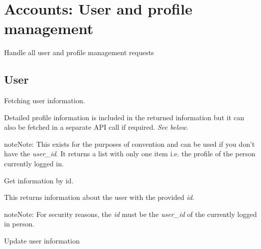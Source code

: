 \documentclass[letterpaper,10pt,english]{sphinxmanual}
\begin{document}
\begin{fulllineitems}
\label{auth:post--api-v1-auth-logout-}
\end{fulllineitems}



\chapter{Accounts: User and profile management}
\label{accounts:ref-accounts}\label{accounts:accounts-user-and-profile-management}\label{accounts::doc}
Handle all user and profile management requests


\section{User}
\label{accounts:user}
Fetching user information.


\begin{fulllineitems}
\label{accounts:get--api-v1-user-}
\end{fulllineitems}


Detailed profile information is included in the returned information but it can
also be fetched in a separate API call if required. \emph{See below}.

\begin{notice}{note}{Note:}
This exists for the purposes of convention and can be used if you don't have the \emph{user\_id}.
It returns a list with only one item i.e. the profile of the person currently logged in.
\end{notice}

Get information by id.


\begin{fulllineitems}
\label{accounts:get--api-v1-profile-_id_-}
\end{fulllineitems}


This returns information about the user with the provided \emph{id}.

\begin{notice}{note}{Note:}
For security reasons, the \emph{id} must be the \emph{user\_id} of the currently logged in person.
\end{notice}

Update user information


\begin{fulllineitems}
\label{accounts:put--api-v1-user-_id_-}
\end{fulllineitems}
\end{document}
